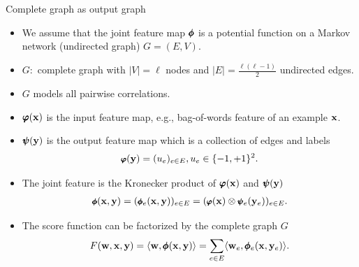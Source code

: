 \documentclass[first=dgreen,second=purple,logo=red]{aaltoslides}
\begin{document}
%
\begin{frame}{Complete graph as output graph}
	\begin{itemize}\footnotesize
		\item We assume that the joint feature map $\pmb \phi$ is a potential function on a Markov network (undirected graph) $G=(E,V)$.
		\item $G:$ complete graph with $|V| = \ell$ nodes and $|E| = \frac{\ell(\ell-1)}{2}$ undirected edges.
		\item $G$ models all pairwise correlations.
		\item $\pmb \varphi(\mathbf {x})$ is the input feature map, e.g., bag-of-words feature of an example $\mathbf {x}$.
		\item $\pmb \psi(\mathbf {y})$ is the output feature map which is a collection of edges and labels
		\begin{align*}\footnotesize
			\pmb \varphi(\mathbf {y}) = (u_{e})_{e\in E},u_e\in\{-1,+1\}^2.
		\end{align*}
		\item The joint feature is the Kronecker product of $\pmb \varphi(\mathbf {x})$ and $\pmb \psi(\mathbf {y})$
		\begin{align*}\footnotesize
			\pmb \phi(\mathbf {x},\mathbf {y}) = (\pmb \phi_e(\mathbf {x},\mathbf {y}))_{e\in E}=(\pmb \varphi(\mathbf {x})\otimes\pmb \psi_e(\mathbf {y}_e))_{e\in E}.
		\end{align*}
		\item The score function can be factorized by the complete graph $G$
		\begin{align*}
			F(\mathbf {w},\mathbf {x},\mathbf {y}) = \langle \mathbf {w}, \pmb \phi(\mathbf {x},\mathbf {y}) \rangle = \sum_{e\in E}\langle \mathbf {w}_e, \pmb \phi_e(\mathbf {x},\mathbf {y}_e) \rangle.
		\end{align*}
	\end{itemize}
\end{frame}
\end{document}
